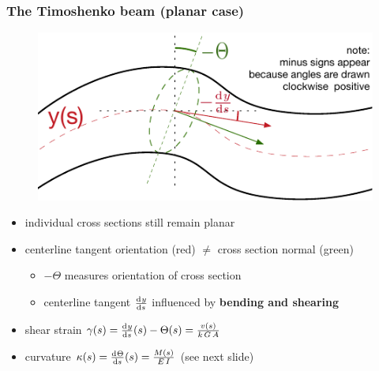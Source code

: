 \begin{frame}
  \frametitle{The Timoshenko beam (planar case)}
  
  \vspace{-1em}
  \begin{figure}
    \centering
    \includegraphics[width=16cm, keepaspectratio=true]{sections/traditional_beams/images/TimoshenkoBeam1}
  \end{figure}
  
  \begin{itemize}
    \item individual cross sections still remain planar
    \item centerline tangent orientation (red) $\neq$ cross section normal (green)
      \begin{itemize}
        \item $-\Theta$ measures orientation of cross section
        \item centerline tangent $\od{y}{s}$ influenced by \textbf{bending and shearing}
      \end{itemize}
    \item shear strain $\gamma(s) = \od{y}{s}(s) - \Theta(s) = \frac{v(s)}{k \, G \, A}$
    \item curvature $\kappa(s) = \od{\Theta}{s}(s) = \frac{M(s)}{E \, I}$ (see next slide)
  \end{itemize}
\end{frame}


